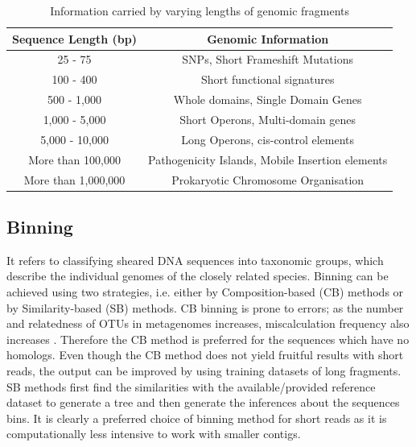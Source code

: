 \begin{table}[ht]
\centering
\caption{Information carried by varying lengths of genomic fragments}
 \begin{tabular}{|c | c|} 
 \hline
 Sequence Length (bp) & Genomic Information \\ [0.5ex] 
 \hline\hline
 25 - 75 & SNPs, Short Frameshift Mutations \\ 
 \hline
 100 - 400 & Short functional signatures \\
 \hline
 500 - 1,000 & Whole domains, Single Domain Genes \\
 \hline
 1,000 - 5,000 & Short Operons, Multi-domain genes \\
 \hline
 5,000 - 10,000 & Long Operons, cis-control elements \\
 \hline
 More than 100,000 & Pathogenicity Islands, Mobile Insertion elements \\
 \hline
 More than 1,000,000 & Prokaryotic Chromosome Organisation \\
 \hline
\end{tabular}
\label{table1}
\end{table}

\subsection{Binning}
It refers to classifying sheared DNA sequences into taxonomic groups, which describe the individual genomes of the closely related species. Binning can be achieved using two strategies, i.e. either by Composition-based (CB) methods or by Similarity-based (SB) methods. CB binning is prone to errors; as the number and relatedness of OTUs in metagenomes increases, miscalculation frequency also increases \cite{ref11}. Therefore the CB method is preferred for the sequences which have no homologs. Even though the CB method does not yield fruitful results with short reads, the output can be improved by using training datasets of long fragments. SB methods first find the similarities with the available/provided reference dataset to generate a tree and then generate the inferences about the sequences bins. It is clearly a preferred choice of binning method for short reads as it is computationally less intensive to work with smaller contigs.

